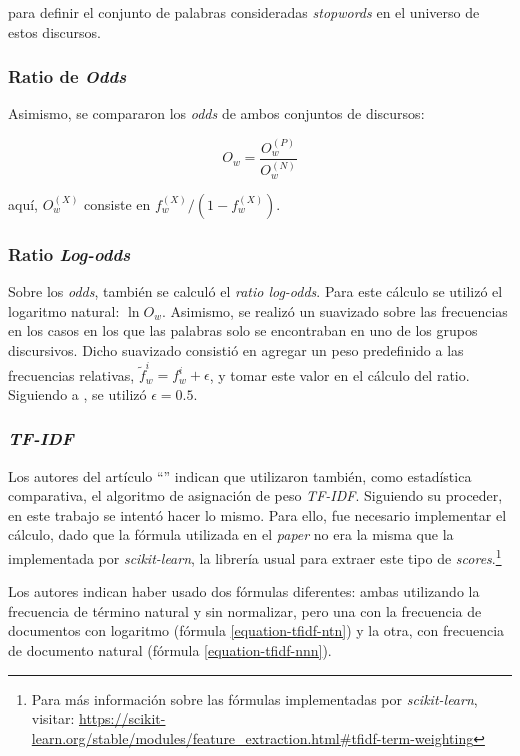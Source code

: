 para definir el conjunto de palabras
consideradas \textit{stopwords} en el universo de estos discursos.

\subsubsection{Ratio de \textit{Odds}}
Asimismo, se compararon los \textit{odds} de ambos conjuntos de discursos:

\begin{equation}
    O_w = \frac{O_{w}^{(P)}}{O_{w}^{(N)}}
\end{equation}

aqu\'i, $O_{w}^{(X)}$ consiste en $f_{w}^{(X)}/(1-f_{w}^{(X)})$.

\subsubsection{Ratio \textit{Log-odds}}
Sobre los \textit{odds}, tambi\'en se calcul\'o el \textit{ratio log-odds}.
Para este c\'alculo se utiliz\'o el logaritmo natural: $\ln{O_w}$.
Asimismo, se realizó un suavizado sobre las frecuencias en los casos
en los que las palabras solo se encontraban en uno de los grupos
discursivos. Dicho suavizado consistió en agregar un peso predefinido a las
frecuencias relativas, $\tilde{f}^{i}_{w} = f^{i}_{w}+\epsilon$, y tomar
este valor en el cálculo del ratio. Siguiendo a \cite{monroe2008fightin},
se utilizó $\epsilon=0.5$.

\subsubsection{\textit{TF-IDF}}
\label{subsubsec-methods-tfidf}
Los autores del art\'iculo ``'' indican
que utilizaron tambi\'en, como estad\'istica comparativa, el algoritmo de asignaci\'on
de peso \textit{TF-IDF}. Siguiendo su proceder, en este trabajo se intent\'o
hacer lo mismo. Para ello, fue necesario implementar el c\'alculo, dado que
la f\'ormula utilizada en el \textit{paper} no era la misma que la implementada
por \textit{scikit-learn}, la librer\'ia usual para extraer
este tipo de \textit{scores}.\footnote{Para m\'as informaci\'on sobre las f\'ormulas
implementadas por \textit{scikit-learn}, visitar:
\url{https://scikit-learn.org/stable/modules/feature_extraction.html\#tfidf-term-weighting}}\par
Los autores indican haber usado dos fórmulas diferentes: ambas utilizando la frecuencia
de término natural y sin normalizar, pero una con la frecuencia de documentos
con logaritmo (fórmula \ref{equation-tfidf-ntn}) y la otra, con frecuencia de documento
natural (fórmula \ref{equation-tfidf-nnn}).

